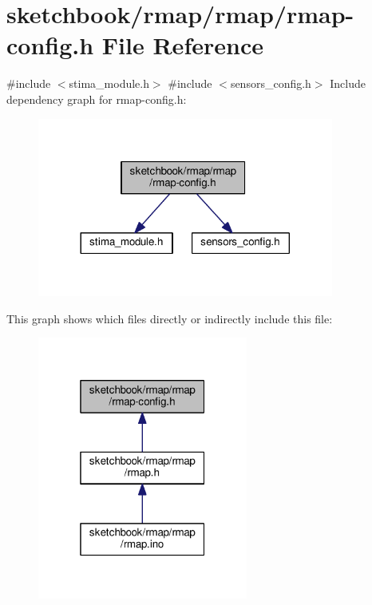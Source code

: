 \hypertarget{rmap-config_8h}{}\section{sketchbook/rmap/rmap/rmap-\/config.h File Reference}
\label{rmap-config_8h}
{\ttfamily \#include $<$stima\+\_\+module.\+h$>$}\newline
{\ttfamily \#include $<$sensors\+\_\+config.\+h$>$}\newline
Include dependency graph for rmap-\/config.h\+:
\nopagebreak
\begin{figure}[H]
\begin{center}
\leavevmode
\includegraphics[width=276pt]{rmap-config_8h__incl}
\end{center}
\end{figure}
This graph shows which files directly or indirectly include this file\+:
\nopagebreak
\begin{figure}[H]
\begin{center}
\leavevmode
\includegraphics[width=196pt]{rmap-config_8h__dep__incl}
\end{center}
\end{figure}
